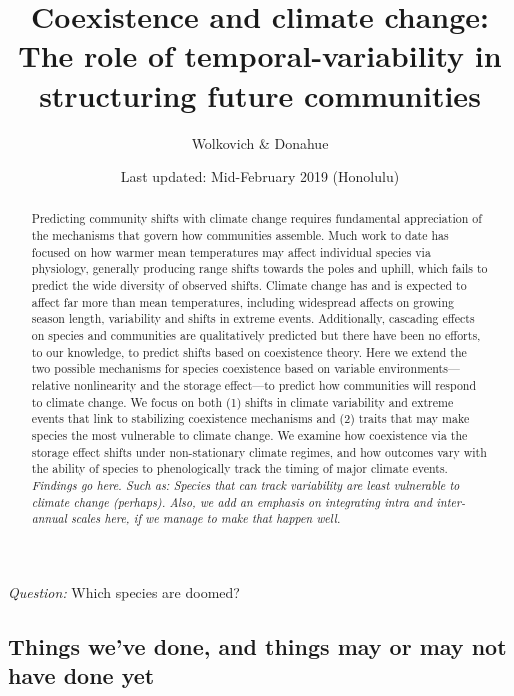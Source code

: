 \documentclass[11pt,a4paper,oneside]{article}
\begin{document}
\renewcommand{\labelitemi}{$-$}
\title{Coexistence and climate change: \\The role of
    temporal-variability in structuring future communities}
    \author{Wolkovich \& Donahue}
\date{Last updated: Mid-February 2019 (Honolulu) \\ } %
\maketitle 

\begin{center}
\emph{Question:} Which species are doomed?
\end{center}

\begin{abstract} Predicting community shifts
with climate change requires fundamental appreciation of the
mechanisms that govern how communities assemble. Much work to date has
focused on how warmer mean temperatures may affect individual species
via physiology, generally producing range shifts towards the poles and
uphill, which fails to predict the wide diversity of observed shifts.
Climate change has and is expected to affect far more than mean
temperatures, including widespread affects on growing season
length, variability and shifts in extreme events. Additionally,
cascading effects on species and communities are qualitatively
predicted but there have been no efforts, to our knowledge, to predict
shifts based on coexistence theory. Here we extend the two possible
mechanisms for species coexistence based on variable environments---
relative nonlinearity and the storage effect---to predict how
communities will respond to climate change. We focus on both (1) shifts in
climate variability and extreme events that link to
stabilizing coexistence mechanisms and (2) traits that may
make species the most vulnerable to climate change. We examine how
coexistence via the storage effect shifts under non-stationary climate regimes, and how outcomes vary with the
ability of species to phenologically track the timing of major climate events. \emph{Findings go here. Such as: Species that can track variability are least vulnerable to climate change (perhaps).  Also, we add an emphasis on integrating intra and inter-annual scales here, if we manage to make that happen well.}
\end{abstract}

\newpage
\tableofcontents

\newpage
\subsection{Things we've done, and things may or may not have done yet}
\end{document}

